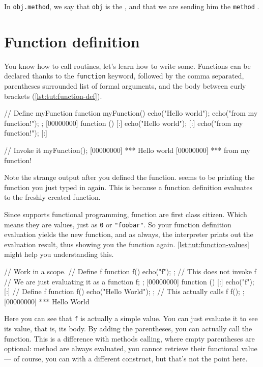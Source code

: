In \lstinline|obj.method|, we say that \lstinline{obj} is the
, and that we are sending him the \lstinline{method}
.

\section{Function definition}

You know how to call routines, let's learn how to write
some. Functions can be declared thanks to the \lstinline{function}
keyword, followed by the comma separated, parentheses surrounded list
of formal arguments, and the body between curly brackets (\autoref{lst:tut:function-def}).

\begin{urbiscript}[caption=Defining a function,label=lst:tut:function-def]
// Define myFunction
function myFunction()
{
  echo("Hello world");
  echo("from my function!");
};
[00000000] function () {
[:]  echo("Hello world");
[:]  echo("from my function!");
[:]}

// Invoke it
myFunction();
[00000000] *** Hello world
[00000000] *** from my function!
\end{urbiscript}

Note the strange output after you defined the function. \us seems to
be printing the function you just typed in again. This is because
a function definition evaluates to the freshly created function.

Since \us supports functional programming, function are first class
citizen. Which means they are values, just as \lstinline{0} or
\lstinline{"foobar"}. So your function definition evaluation yields the
new function, and as always, the interpreter prints out the evaluation
result, thus showing you the function again. \autoref{lst:tut:function-values}
might help you understanding this.

\begin{urbiscript}[caption=Function as values,label=lst:tut:function-values]
// Work in a scope.
{
  // Define f
  function f()
  {
    echo("f");
  };
  // This does not invoke f
  // We are just evaluating it as a function
  f;
};
[00000000] function () {
[:]  echo("f");
[:]}
{
  // Define f
  function f()
  {
    echo("Hello World");
  };
  // This actually calls f
  f();
};
[00000000] *** Hello World
\end{urbiscript}

Here you can see that \lstinline{f} is actually a simple value. You can just
evaluate it to see its value, that is, its body. By adding the
parentheses, you can actually call the function. This is a difference
with methods calling, where empty parentheses are optional: method are
always evaluated, you cannot retrieve their functional value --- of
course, you can with a different construct, but that's not the point
here.

